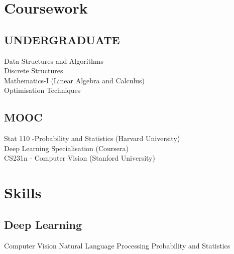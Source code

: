 \documentclass[letterpaper]{deedy-resume} %
\begin{document}
\begin{minipage}[t]{0.33\textwidth}
\sectionspace %


\section{Coursework}

\subsection{UNDERGRADUATE}

Data Structures and Algorithms \\
Discrete Structures \\
Mathematics-I (Linear Algebra and Calculus) \\
Optimisation Techniques 

\sectionspace %


\subsection{MOOC}

Stat 110 -Probability and Statistics (Harvard University) \\
Deep Learning Specialisation (Coursera) \\
CS231n - Computer Vision (Stanford University)

\sectionspace %


\section{Skills}

\subsection{Deep Learning}

Computer Vision \textbullet{} Natural Language Processing \textbullet{} Probability and Statistics \\

\sectionspace %


\end{minipage}
\end{document}
